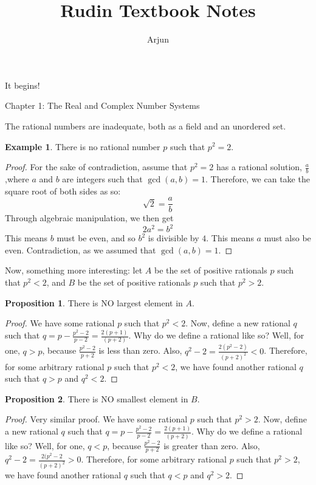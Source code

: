 \documentclass{article}
\title{Rudin Textbook Notes}
\author{Arjun}
\theoremstyle{definition}
\newtheorem{exmp}{Example}[section]
\newtheorem{prop}{Proposition}[section]
\begin{document}
\maketitle
\begin{center}
 It begins!
 \end{center}
 \newpage
\begin{center}
 Chapter 1: The Real and Complex Number Systems
 \end{center}
 
 \begin{section}
 \noindent The rational numbers are inadequate, both as a field and an unordered set.
 \begin{exmp}
There is no rational number $p$ such that $p^2 = 2$.
\end{exmp}


\begin{proof}
For the sake of contradiction, assume that $p^2 = 2$ has a rational solution, $\frac{a}{b}$ ,where $a$ and $b$ are integers such that $\gcd (a,b) = 1$. Therefore, we can take the square root of both sides as so: 
\[ \sqrt{2} = \frac{a}{b} \]
Through algebraic manipulation, we then get 
\[ 2a^2 = b^2 \]
This means $b$ must be even, and so $b^2$ is divisible by $4$. This means $a$ must also be even. Contradiction, as we assumed that $\gcd (a,b) = 1$.
\end{proof}

\noindent Now, something more interesting: let $A$ be the set of positive rationals $p$ such that $p^2 < 2$, and $B$ be the set of positive rationals $p$ such that $p^2 > 2$.

\begin{prop}
There is NO largest element in $A$.
\end{prop}
\begin{proof}
We have some rational $p$ such that $p^2 < 2$. Now, define a new rational $q$ such that $q = p - \frac{p^2-2}{p-2} = \frac{2(p+1)}{(p+2)}$. Why do we define a rational like so? Well, for one, $q > p$, because $\frac{p^2-2}{p+2}$ is less than zero. Also, $q^2 - 2 = \frac{2(p^2-2)}{(p+2)^2} < 0$. Therefore, for some arbitrary rational $p$ such that $p^2 < 2$, we have found another rational $q$ such that $q > p$ and $q^2 < 2$.
\end{proof}

\begin{prop}
There is NO smallest element in $B$.
\end{prop}
\begin{proof}
Very similar proof. We have some rational $p$ such that $p^2 > 2$. Now, define a new rational $q$ such that $q = p - \frac{p^2-2}{p-2} = \frac{2(p+1)}{(p+2)}$. Why do we define a rational like so? Well, for one, $q < p$, because $\frac{p^2-2}{p+2}$ is greater than zero. Also, $q^2 - 2 = \frac{2(p^2-2}{(p+2)^2} > 0$. Therefore, for some arbitrary rational $p$ such that $p^2 > 2$, we have found another rational $q$ such that $q < p$ and $q^2 > 2$.
\end{proof}


\end{section}
\end{document}
